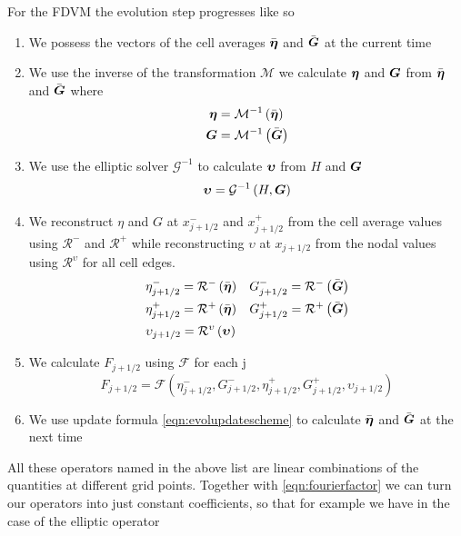 For the FDVM the evolution step progresses like so
\begin{enumerate}
	\item We possess the vectors of the cell averages $\bar{\boldsymbol{\eta}}$ and $\bar{\boldsymbol{G}}$ at the current time
	\item We use the inverse of the transformation $\mathcal{M}$ we calculate ${\boldsymbol{\eta}}$ and ${\boldsymbol{G}}$ from $\bar{\boldsymbol{\eta}}$ and $\bar{\boldsymbol{G}}$ where
	\begin{align*}
	{\boldsymbol{\eta}} &= \mathcal{M}^{-1}\left(\bar{\boldsymbol{\eta}} \right) \\
	{\boldsymbol{G}} &= \mathcal{M}^{-1}\left(\bar{\boldsymbol{G}} \right) \\
	\end{align*}
	\item We use the elliptic solver $\mathcal{G}^{-1}$ to calculate ${\boldsymbol{\upsilon}}$ from  $H$ and ${\boldsymbol{G}}$
	\[{\boldsymbol{\upsilon}} = \mathcal{G}^{-1}\left(H, {\boldsymbol{G}}\right)\]
	\item We reconstruct $\eta$ and $G$ at $x^-_{j+1/2}$ and $x^+_{j+1/2}$ from the cell average values using $\mathcal{R}^{-}$ and $\mathcal{R}^{+}$ while reconstructing $\upsilon$ at $x_{j+1/2}$ from the nodal values using $\mathcal{R}^{\upsilon}$ for all cell edges.
	\begin{align*}
	&\eta^-_{j+1/2} = \mathcal{R}^{-}\left(\bar{\boldsymbol{\eta}}\right)  &G^-_{j+1/2} = \mathcal{R}^{-}\left(\bar{\boldsymbol{G}}\right) \\
	&\eta^+_{j+1/2} = \mathcal{R}^{+}\left(\bar{\boldsymbol{\eta}}\right)  &G^+_{j+1/2} = \mathcal{R}^{+}\left(\bar{\boldsymbol{G}}\right) \\
	&\upsilon_{j+1/2} = \mathcal{R}^{\upsilon}\left({\boldsymbol{\upsilon}}\right)
	\end{align*}
	\item We calculate $F_{j+1/2}$ using $\mathcal{F}$ for each j
	\[F_{j+1/2} =\mathcal{F} \left(\eta^-_{j+1/2}, G^-_{j+1/2},\eta^+_{j+1/2}, G^+_{j+1/2},\upsilon_{j+1/2}  \right) \]
	\item We use update formula \eqref{eqn:evolupdatescheme} to calculate $\bar{\boldsymbol{\eta}}$ and $\bar{\boldsymbol{G}}$ at the next time  
\end{enumerate}

All these operators named in the above list are linear combinations of the quantities at different grid points. Together with \eqref{eqn:fourierfactor} we can turn our operators into just constant coefficients, so that for example we have in the case of the elliptic operator

